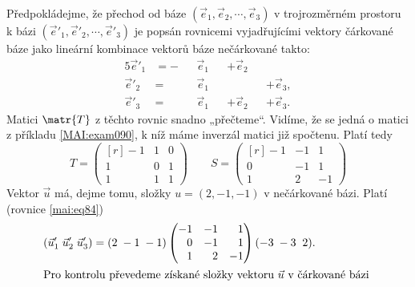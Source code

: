 % 
\begin{mdframed}[style=mdexam]
  \begin{example}\label{MAI:exam089}
    \begingroup
    \renewcommand\arraystretch{1.0}
    \renewcommand\arraycolsep{3pt}
    Předpokládejme, že přechod od báze \((\vec{e}_1, \vec{e}_2, \cdots, \vec{e}_3)\) v
    trojrozměrném prostoru k bázi \((\vec{e}'_1,\vec{e}'_2, \cdots, \vec{e}'_3)\) je popsán
    rovnicemi vyjadřujícími vektory čárkované báze jako lineární kombinace vektorů báze
    nečárkované takto:
    \begin{alignat*}{5}
      \vec{e}'_1&=-&& \vec{e}_1 && +\vec{e}_2 &&       \\
      \vec{e}'_2&= && \vec{e}_1 &&      && +\vec{e}_3, \\
      \vec{e}'_3&= && \vec{e}_1 && +\vec{e}_2 && +\vec{e}_3.    
    \end{alignat*}  
    Matici \(\matr{T}\) z těchto rovnic snadno „přečteme“. Vidíme, že se jedná o matici z
    příkladu \ref{MAI:exam090}, k níž máme inverzál matici již spočtenu. Platí tedy
    \begin{equation*}
      T = 
        \begin{pmatrix*}[r]
         -1 & 1 & 0 \\
          1 & 0 & 1 \\
          1 & 1 & 1 
        \end{pmatrix*} 
      \qquad
      S = 
      \begin{pmatrix*}[r]
        -1 & -1 &  1 \\
         0 & -1 &  1 \\
         1 &  2 & -1
      \end{pmatrix*}     
    \end{equation*}
    Vektor \(\vec{u}\) má, dejme tomu, složky \(u = (2, -1, -1)\) v nečárkované bázi. Platí
    (rovnice \ref{mai:eq84})
    \begin{gather*}    
      \begin{aligned}
        (\vec{u}'_1\; \vec{u}'_2\;  \vec{u}'_3) &= (2\; -1\; -1)
        \begin{pmatrix*}[r]
          -1 & -1 &  1 \\
           0 & -1 &  1 \\
           1 &  2 & -1
        \end{pmatrix*} 
        (-3\; -3\;\; 2).                            \\
        \shortintertext{Pro kontrolu převedeme získané složky vektoru \(\vec{u}\) v čárkované bázi 
}
\end{aligned}
\end{gather*}
\end{example}
\end{mdframed}

